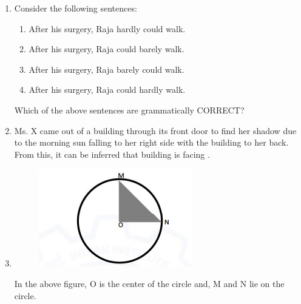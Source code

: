 \documentclass[journal]{IEEEtran}
\begin{document}
\begin{enumerate}[leftmargin=0pt]

\item Consider the following sentences:
\begin{enumerate}
\item After his surgery, Raja hardly could walk.
\item After his surgery, Raja could barely walk.
\item After his surgery, Raja barely could walk.
\item After his surgery, Raja could hardly walk.
\end{enumerate}

Which of the above sentences are grammatically CORRECT?

\begin{enumerate}
\end{enumerate}

\hfill{}

\item Ms. X came out of a building through its front door to find her shadow due
to the morning sun falling to her right side with the building to her back.
From this, it can be inferred that building is facing \underline{\hspace{2cm}}.

\begin{enumerate}
\end{enumerate}

\hfill{}

\item 
\begin{figure}[h]
\centering
\includegraphics[width=0.5\columnwidth]{Figs/image (34).png}
\caption*{}
\label{fig:3}
\end{figure}
In the above figure, O is the center of the circle and, M and N lie on the
circle.


\end{enumerate}
\end{document}
